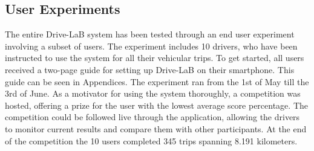 \subsection{User Experiments}\label{subsec:userexp}

The entire Drive-LaB system has been tested through an end user experiment involving a subset of users. The experiment includes 10 drivers, who have been instructed to use the system for all their vehicular trips. To get started, all users received a two-page guide for setting up Drive-LaB on their smartphone. This guide can be seen in Appendices. The experiment ran from the 1st of May till the 3rd of June. As a motivator for using the system thoroughly, a competition was hosted, offering a prize for the user with the lowest average score percentage. The competition could be followed live through the application, allowing the drivers to monitor current results and compare them with other participants. At the end of the competition the 10 users completed 345 trips spanning 8.191 kilometers.

